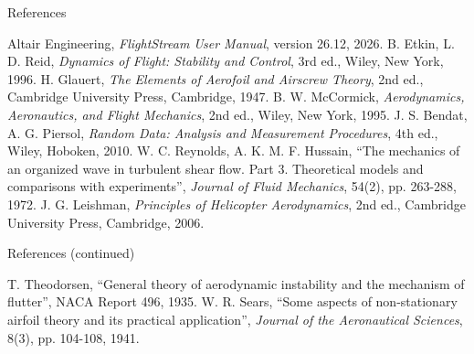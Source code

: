 \documentclass[aspectratio=169,11pt]{beamer}
\begin{document}
\begin{frame}{References}
\begin{reflist}
   
   Altair Engineering, \emph{FlightStream User Manual}, version 26.12, 2026.
   \recordsref
   
   B. Etkin, L. D. Reid, \emph{Dynamics of Flight: Stability and
        Control}, 3rd ed., Wiley, New York, 1996.
   H. Glauert, \emph{The Elements of Aerofoil and Airscrew Theory}, 2nd
        ed., Cambridge University Press, Cambridge, 1947.
   B. W. McCormick, \emph{Aerodynamics, Aeronautics, and Flight
        Mechanics}, 2nd ed., Wiley, New York, 1995.
   J. S. Bendat, A. G. Piersol, \emph{Random Data: Analysis and
        Measurement Procedures}, 4th ed., Wiley, Hoboken, 2010.
   W. C. Reynolds, A. K. M. F. Hussain, ``The mechanics of an organized
        wave in turbulent shear flow. Part 3. Theoretical models and
        comparisons with experiments'', \emph{Journal of Fluid Mechanics},
        54(2), pp. 263-288, 1972.
   J. G. Leishman, \emph{Principles of Helicopter Aerodynamics}, 2nd
        ed., Cambridge University Press, Cambridge, 2006.
\end{reflist}
\end{frame}

\begin{frame}{References (continued)}
\begin{reflist}
  \setcounter{enumi}{10}
   T. Theodorsen, ``General theory of aerodynamic instability and the
        mechanism of flutter'', NACA Report 496, 1935.
   W. R. Sears, ``Some aspects of non-stationary airfoil theory and its
        practical application'', \emph{Journal of the Aeronautical Sciences},
        8(3), pp. 104-108, 1941.
\end{reflist}
\end{frame}
\end{document}

